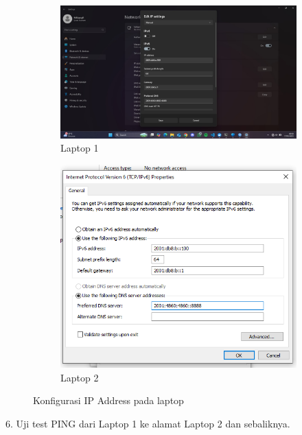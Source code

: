 \begin{figure}[H]
    \centering
    \begin{subfigure}[b]{0.3\linewidth}
      \centering
      \includegraphics[width=\linewidth]{image/statis8.jpg}
      \caption{Laptop 1}
    \end{subfigure}
    \hspace{1cm}
    \begin{subfigure}[b]{0.3\linewidth}
      \centering
      \includegraphics[width=\linewidth]{image/statis7.png}
      \caption{Laptop 2}
    \end{subfigure}
    \caption{Konfigurasi IP Address pada laptop}
\end{figure}
6. Uji test PING dari Laptop 1 ke alamat Laptop 2 dan sebaliknya. 
